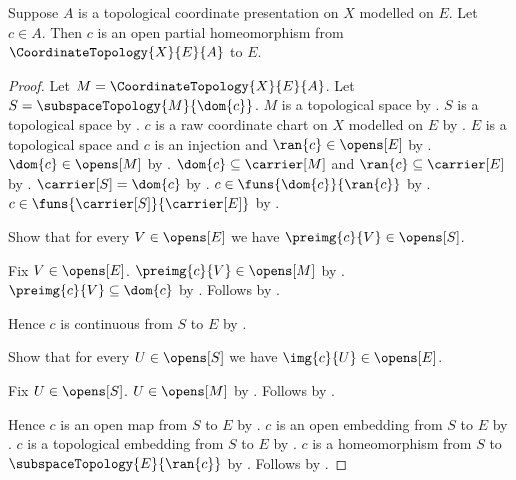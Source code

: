\begin{theorem}\label{coordinate_chart_is_partial_homeomorphism}
    Suppose $A$ is a topological coordinate presentation on $X$ modelled on $E$.
    Let $c\in A$.
    Then $c$ is an open partial homeomorphism from $\CoordinateTopology{X}{E}{A}$
        to $E$.
\end{theorem}
\begin{proof}
    Let $M=\CoordinateTopology{X}{E}{A}$.
    Let $S=\subspaceTopology{M}{\dom{c}}$.
    $M$ is a topological space by .
    $S$ is a topological space by .
    $c$ is a raw coordinate chart on $X$ modelled on $E$ by
        .
    $E$ is a topological space and $c$ is an injection and
        $\ran{c}\in\opens[E]$ by .
    $\dom{c}\in\opens[M]$ by .
    $\dom{c}\subseteq\carrier[M]$ and $\ran{c}\subseteq\carrier[E]$ by
        .
    $\carrier[S]=\dom{c}$ by .
    $c\in\funs{\dom{c}}{\ran{c}}$ by .
    $c\in\funs{\carrier[S]}{\carrier[E]}$ by .

    Show that for every $V\in\opens[E]$ we have $\preimg{c}{V}\in\opens[S]$.
    \begin{subproof}
        Fix $V\in\opens[E]$.
        $\preimg{c}{V}\in\opens[M]$ by .
        $\preimg{c}{V}\subseteq\dom{c}$ by .
        Follows by .
    \end{subproof}
    Hence $c$ is continuous from $S$ to $E$ by .

    Show that for every $U\in\opens[S]$ we have $\img{c}{U}\in\opens[E]$.
    \begin{subproof}
        Fix $U\in\opens[S]$.
        $U\in\opens[M]$ by .
        Follows by .
    \end{subproof}
    Hence $c$ is an open map from $S$ to $E$ by .
    $c$ is an open embedding from $S$ to $E$ by
        .
    $c$ is a topological embedding from $S$ to $E$ by .
    $c$ is a homeomorphism from $S$ to $\subspaceTopology{E}{\ran{c}}$ by
        .
    Follows by .
\end{proof}

